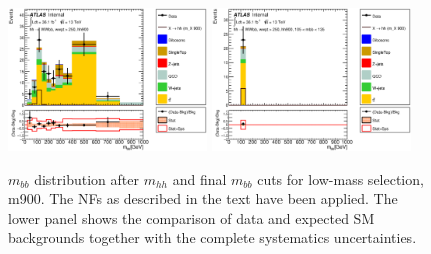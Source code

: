 \begin{figure}[!h]
\begin{center}
\includegraphics*[width=0.47\textwidth] {figures/Unblinded_mbb/C_reOpt700_mww_bbpt210_wwpt250_hh900_bbMass_regionA_met25d020.eps}
\includegraphics*[width=0.47\textwidth] {figures/Unblinded_mbb/C_reOpt700_mww_bbpt210_wwpt250_hh900_mbb_bbMass_regionA_met25d020.eps}
\caption[$m_{bb}$ distribution after $m_{hh}$ and final $m_{bb}$ cuts for low-mass selection, m900.]{$m_{bb}$ distribution after $m_{hh}$ and final $m_{bb}$ cuts for low-mass selection, m900. The NFs as described in the text have been applied. The lower panel shows the comparison of data and expected SM backgrounds together with the complete systematics uncertainties.}
\end{center}
\end{figure}

